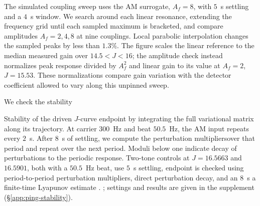 \documentclass[11pt,a4paper]{article}
\providecommand{\DIFaddtex}[1]{{\protect\color{blue} \sf #1}} %
\providecommand{\DIFdeltex}[1]{{\protect\color{red} \scriptsize #1}} %
\providecommand{\DIFaddbegin}{} %
\providecommand{\DIFaddend}{} %
\providecommand{\DIFdelbegin}{} %
\providecommand{\DIFdelend}{} %
\providecommand{\DIFadd}[1]{\texorpdfstring{\DIFaddtex{#1}}{#1}} %
\providecommand{\DIFdel}[1]{\texorpdfstring{\DIFdeltex{#1}}{}} %
\begin{document}
The simulated coupling sweep uses the AM surrogate, $A_f=8$, with $5$~s
settling and a $4$~s window. We search around each linear resonance, extending
the frequency grid until each sampled maximum is bracketed, and compare
amplitudes $A_f=2,4,8$ at nine couplings. Local parabolic interpolation changes
the sampled peaks by less than $1.3\%$. The figure scales the linear reference
to the median measured gain over $14.5<J<16$; the amplitude check instead
normalizes peak response divided by $A_f^2$ and linear gain to its value at
$A_f=2$, $J=15.53$. These normalizations compare gain variation with the detector coefficient
allowed to vary along this unpinned sweep.


\DIFdelbegin \DIFdel{We check the stability }\DIFdelend \DIFaddbegin \fi

\DIFadd{Stability }\DIFaddend of the driven \DIFdelbegin \DIFdel{$J$-curve endpoint by integrating the full
variational matrix along its trajectory. At carrier $300$~Hz and beat $50.5$~Hz,
the AM input repeats every $2$~s. After $8$~s of settling, we compute the
perturbation
multipliersover that period and repeat over the next period.
Moduli below one indicate decay of perturbations to the periodic response.
Two-tone controls at $J=16.5663$ and $16.5901$, both with a $50.5$~Hz beat,
use $5$~s settling, }\DIFdelend \DIFaddbegin \DIFadd{endpoint is checked using period-to-period perturbation
multipliers, }\DIFaddend direct perturbation decay, and \DIFdelbegin \DIFdel{an $8$~s }\DIFdelend \DIFaddbegin \DIFadd{a }\DIFaddend finite-time Lyapunov estimate\DIFdelbegin \DIFdel{.
}\DIFdelend \DIFaddbegin \DIFadd{;
settings and results are given in the supplement (\S\ref{app:ping-stability}).
}\DIFaddend
\end{document}
